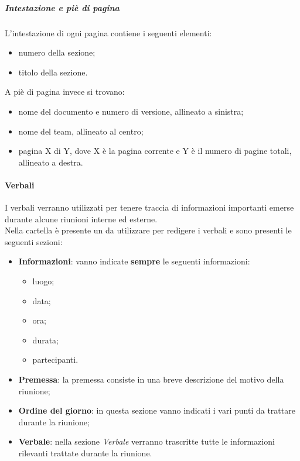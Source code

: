 		\subparagraph{Intestazione e piè di pagina}
		\label{sec:3.1.2.4.4}
			L'intestazione di ogni pagina contiene i seguenti elementi:
			\begin{itemize}
				\item numero della sezione;
				\item titolo della sezione.
			\end{itemize}
			A piè di pagina invece si trovano:
			\begin{itemize}
				\item nome del documento e numero di versione, allineato a sinistra;
				\item nome del team, allineato al centro;
				\item pagina X di Y, dove X è la pagina corrente e Y è il numero di pagine totali, allineato a destra.
			\end{itemize}
	
	\paragraph{Verbali}
	\label{sec:3.1.2.5}
		I verbali verranno utilizzati per tenere traccia di informazioni importanti emerse durante alcune riunioni interne ed esterne. \\
		Nella cartella  è presente un  da utilizzare per redigere i verbali e sono presenti le seguenti sezioni:
		\begin{itemize}
			\item \textbf{Informazioni}: vanno indicate \textbf{sempre} le seguenti informazioni:
			\begin{itemize}
				\item luogo;
				\item data;
				\item ora;
				\item durata;
				\item partecipanti.
			\end{itemize}
			\item \textbf{Premessa}: la premessa consiste in una breve descrizione del motivo della riunione;
			\item \textbf{Ordine del giorno}: in questa sezione vanno indicati i vari punti da trattare durante la riunione;
			\item \textbf{Verbale}: nella sezione \textit{Verbale} verranno trascritte tutte le informazioni rilevanti trattate durante la riunione.
		\end{itemize}	
